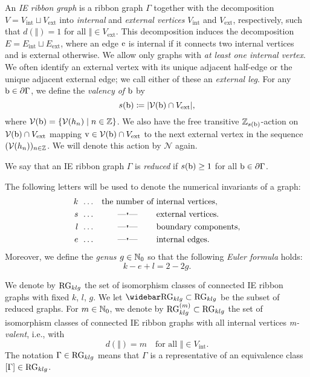 \documentclass[\MainFolder/Text.tex]{subfiles}
\begin{document}
\begin{Definition}
An \emph{IE ribbon graph} is a ribbon graph $\Gamma$ together with the decomposition $V = V_{\mathrm{int}} \sqcup V_{\mathrm{ext}}$ into \emph{internal} and \emph{external vertices} $V_{\mathrm{int}}$ and $V_{\mathrm{ext}}$, respectively, such that $d(\Vert) = 1$ for all $\Vert\in V_{\mathrm{ext}}$. This decomposition induces the decomposition $E = E_{\mathrm{int}} \sqcup E_{\mathrm{ext}}$, where an edge $\mathrm{e}$ is internal if it connects two internal vertices and is external otherwise. We allow only graphs with \emph{at least one internal vertex}. We often identify an external vertex with its unique adjacent half-edge or the unique adjacent external edge; we call either of these an \emph{external leg}. For any $\mathrm{b} \in \partial \Gamma$, we define the \emph{valency of $\mathrm{b}$} by
$$ s(\mathrm{b}) \coloneqq |\mathcal{V}(\mathrm{b}) \cap V_{\mathrm{ext}}|, $$
where $\mathcal{V}(\mathrm{b}) = \{\mathcal{V}(h_n) \mid n\in \mathbb{Z}\}$. We also have the free transitive $\mathbb{Z}_{s(\mathrm{b})}$-action on $\mathcal{V}(\mathrm{b})\cap V_{\mathrm{ext}}$ mapping $\mathrm{v}\in \mathcal{V}(\mathrm{b}) \cap V_{\mathrm{ext}}$ to the next external vertex in the sequence $(\mathcal{V}(h_n))_{n\in\mathbb{Z}}$. We will denote this action by $\mathcal{N}$ again.

We say that an IE ribbon graph $\Gamma$ is \emph{reduced} if $s(\mathrm{b}) \ge 1$ for all $\mathrm{b}\in \partial \Gamma$.

The following letters will be used to denote the numerical invariants of a graph:
$$\begin{aligned}
k &\;\,\dots && \text{the number of internal vertices}, \\
s &\;\,\dots && \makebox[\widthof{the number of}]{---\ditto---} \text{ external vertices.}\\
l &\;\,\dots && \makebox[\widthof{the number of}]{---\ditto---}\text{ boundary components,} \\
e &\;\,\dots && \makebox[\widthof{the number of}]{---\ditto---} \text{ internal edges.}
\end{aligned}$$
Moreover, we define the \emph{genus $g\in \mathbb{N}_0$} so that the following \emph{Euler formula} holds:
\begin{equation} \label{Eq:EulerFormula}
 k - e + l = 2 - 2g.
\end{equation}\par
We denote by $\mathrm{RG}_{klg}$ the set of isomorphism classes of connected IE ribbon graphs with fixed $k$, $l$, $g$. We let $\RRG_{klg} \subset \RG_{klg}$ be the subset of reduced graphs. For $m\in \mathbb{N}_0$, we denote by $\mathrm{RG}_{klg}^{(m)} \subset \mathrm{RG}_{klg}$ the set of isomorphism classes of connected IE ribbon graphs with all internal vertices \emph{m-valent}, i.e., with 
$$ d(\Vert) = m\quad\text{for all }\Vert\in V_{\mathrm{int}}. $$
The notation $\Gamma \in \mathrm{RG}_{klg}$ means that $\Gamma$ is a representative of an equivalence class $[\Gamma]\in \mathrm{RG}_{klg}$.
\end{Definition}
\end{document}
